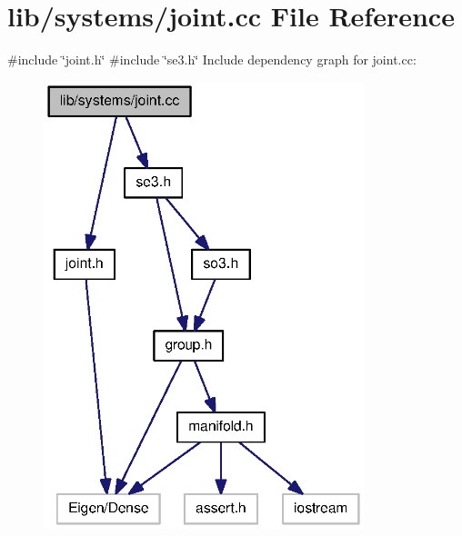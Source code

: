 \section{lib/systems/joint.cc \-File \-Reference}
\label{joint_8cc}
{\ttfamily \#include \char`\"{}joint.\-h\char`\"{}}\*
{\ttfamily \#include \char`\"{}se3.\-h\char`\"{}}\*
\-Include dependency graph for joint.\-cc\-:
\nopagebreak
\begin{figure}[H]
\begin{center}
\leavevmode
\includegraphics[width=264pt]{joint_8cc__incl}
\end{center}
\end{figure}
